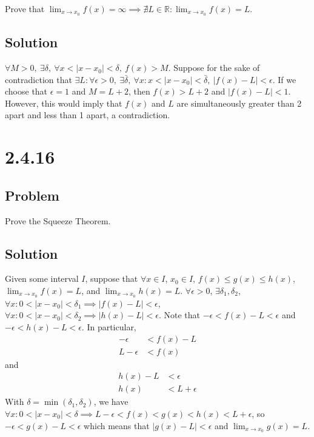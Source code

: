 \documentclass[12pt]{article}
\newcommand{\abs}  [1]{\left|       #1 \right|      }
\newcommand{\R}    [0]{\mathbb{R}                   }
\begin{document}
Prove that $\lim_{x \to x_0} f(x) = \infty \implies \nexists L \in \R : \lim_{x \to x_0} f(x) = L$.

\subsection*{Solution}

$\forall M > 0,\ \exists \delta,\ \forall x < \abs{x - x_0} < \delta,\ f(x) > M$. Suppose for the sake of contradiction that $\exists L : \forall \epsilon > 0,\ \exists \bar{\delta},\ \forall x : x < \abs{x - x_0} < \bar{\delta},\ \abs{f(x) - L} < \epsilon$. If we choose that $\epsilon = 1$ and $M = L + 2$, then $f(x) > L + 2$ and $\abs{f(x) - L} < 1$. However, this would imply that $f(x)$ and $L$ are simultaneously greater than 2 apart and less than 1 apart, a contradiction.



\section*{2.4.16}

\subsection*{Problem}

Prove the Squeeze Theorem.

\subsection*{Solution}

Given some interval $I$, suppose that $\forall x \in I$, $x_0 \in I$, $f(x) \leq g(x) \leq h(x)$, $\lim_{x \to x_0} f(x) = L$, and $\lim_{x \to x_0} h(x) = L$. $\forall \epsilon > 0$, $\exists \delta_1, \delta_2$, $\forall x : 0 < \abs{x - x_0} < \delta_1 \implies \abs{f(x) - L} < \epsilon$, $\forall x : 0 < \abs{x - x_0} < \delta_2 \implies \abs{h(x) - L} < \epsilon$. Note that $-\epsilon < f(x) - L < \epsilon$ and $-\epsilon < h(x) - L < \epsilon$. In particular,
\begin{align*}
    -\epsilon &< f(x) - L \\
    L - \epsilon &< f(x)
\end{align*}
and
\begin{align*}
    h(x) - L &< \epsilon \\
    h(x) &< L + \epsilon
\end{align*}
With $\delta = \min(\delta_1, \delta_2)$, we have $\forall x : 0 < \abs{x - x_0} < \delta \implies L - \epsilon < f(x) < g(x) < h(x) < L + \epsilon$, so $-\epsilon < g(x) - L < \epsilon$ which means that $\abs{g(x) - L} < \epsilon$ and $\lim_{x \to x_0} g(x) = L$.
\end{document}
